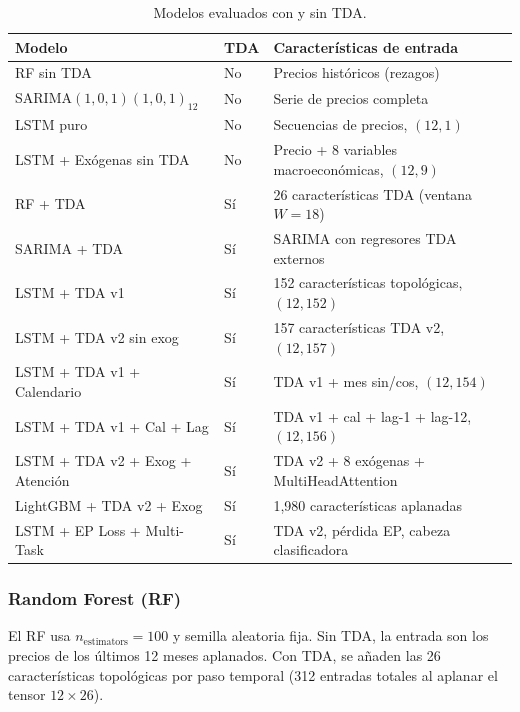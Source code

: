 \documentclass[12pt, a4paper]{article}
\begin{document}
\begin{table}[H]
  \centering
  \caption{Modelos evaluados con y sin TDA.}
  \label{tab:modelos}
  \renewcommand{\arraystretch}{1.2}
  \begin{tabularx}{\linewidth}{p{4.2cm}p{1.3cm}X}
    \toprule
    \textbf{Modelo} & \textbf{TDA} & \textbf{Características de entrada} \\
    \midrule
    RF sin TDA                        & No  & Precios históricos (rezagos) \\
    SARIMA$(1,0,1)(1,0,1)_{12}$       & No  & Serie de precios completa \\
    LSTM puro                         & No  & Secuencias de precios, $(12, 1)$ \\
    LSTM + Exógenas sin TDA           & No  & Precio + 8 variables macroeconómicas, $(12, 9)$ \\
    \midrule
    RF + TDA                          & Sí  & 26 características TDA (ventana $W=18$) \\
    SARIMA + TDA                      & Sí  & SARIMA con regresores TDA externos \\
    LSTM + TDA v1                     & Sí  & 152 características topológicas, $(12, 152)$ \\
    LSTM + TDA v2 sin exog            & Sí  & 157 características TDA v2, $(12, 157)$ \\
    LSTM + TDA v1 + Calendario        & Sí  & TDA v1 + mes sin/cos, $(12, 154)$ \\
    LSTM + TDA v1 + Cal + Lag         & Sí  & TDA v1 + cal + lag-1 + lag-12, $(12, 156)$ \\
    LSTM + TDA v2 + Exog + Atención   & Sí  & TDA v2 + 8 exógenas + MultiHeadAttention \\
    LightGBM + TDA v2 + Exog          & Sí  & 1{,}980 características aplanadas \\
    LSTM + EP Loss + Multi-Task       & Sí  & TDA v2, pérdida EP, cabeza clasificadora \\
    \bottomrule
  \end{tabularx}
\end{table}

\subsubsection{Random Forest (RF)}
El RF usa $n_\mathrm{estimators} = 100$ y semilla aleatoria fija. Sin TDA, la entrada son los
precios de los últimos 12 meses aplanados. Con TDA, se añaden las 26 características topológicas
por paso temporal (312 entradas totales al aplanar el tensor $12 \times 26$).
\end{document}

